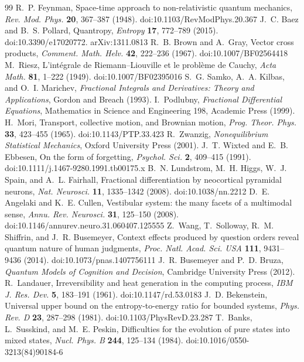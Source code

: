 \documentclass[10pt]{article}
\begin{document}
\begin{thebibliography}{99}
 R.~P. Feynman, Space-time approach to non-relativistic quantum mechanics, \textit{Rev. Mod. Phys.} \textbf{20}, 367--387 (1948). doi:10.1103/RevModPhys.20.367
 J.~C. Baez and B.~S. Pollard, Quantropy, \textit{Entropy} \textbf{17}, 772--789 (2015). doi:10.3390/e17020772. arXiv:1311.0813
 R.~B. Brown and A.~Gray, Vector cross products, \textit{Comment. Math. Helv.} \textbf{42}, 222--236 (1967). doi:10.1007/BF02564418
 M.~Riesz, L'int\'egrale de Riemann--Liouville et le probl\`eme de Cauchy, \textit{Acta Math.} \textbf{81}, 1--222 (1949). doi:10.1007/BF02395016
 S.~G. Samko, A.~A. Kilbas, and O.~I. Marichev, \textit{Fractional Integrals and Derivatives: Theory and Applications}, Gordon and Breach (1993).
 I.~Podlubny, \textit{Fractional Differential Equations}, Mathematics in Science and Engineering 198, Academic Press (1999).
 H.~Mori, Transport, collective motion, and Brownian motion, \textit{Prog. Theor. Phys.} \textbf{33}, 423--455 (1965). doi:10.1143/PTP.33.423
 R.~Zwanzig, \textit{Nonequilibrium Statistical Mechanics}, Oxford University Press (2001).
 J.~T. Wixted and E.~B. Ebbesen, On the form of forgetting, \textit{Psychol. Sci.} \textbf{2}, 409--415 (1991). doi:10.1111/j.1467-9280.1991.tb00175.x
 B.~N. Lundstrom, M.~H. Higgs, W.~J. Spain, and A.~L. Fairhall, Fractional differentiation by neocortical pyramidal neurons, \textit{Nat. Neurosci.} \textbf{11}, 1335--1342 (2008). doi:10.1038/nn.2212
 D.~E. Angelaki and K.~E. Cullen, Vestibular system: the many facets of a multimodal sense, \textit{Annu. Rev. Neurosci.} \textbf{31}, 125--150 (2008). doi:10.1146/annurev.neuro.31.060407.125555
 Z.~Wang, T.~Solloway, R.~M. Shiffrin, and J.~R. Busemeyer, Context effects produced by question orders reveal quantum nature of human judgments, \textit{Proc. Natl. Acad. Sci. USA} \textbf{111}, 9431--9436 (2014). doi:10.1073/pnas.1407756111
 J.~R. Busemeyer and P.~D. Bruza, \textit{Quantum Models of Cognition and Decision}, Cambridge University Press (2012).
 R.~Landauer, Irreversibility and heat generation in the computing process, \textit{IBM J. Res. Dev.} \textbf{5}, 183--191 (1961). doi:10.1147/rd.53.0183
 J.~D. Bekenstein, Universal upper bound on the entropy-to-energy ratio for bounded systems, \textit{Phys. Rev. D} \textbf{23}, 287--298 (1981). doi:10.1103/PhysRevD.23.287
 T.~Banks, L.~Susskind, and M.~E. Peskin, Difficulties for the evolution of pure states into mixed states, \textit{Nucl. Phys. B} \textbf{244}, 125--134 (1984). doi:10.1016/0550-3213(84)90184-6

\end{thebibliography}
\end{document}
